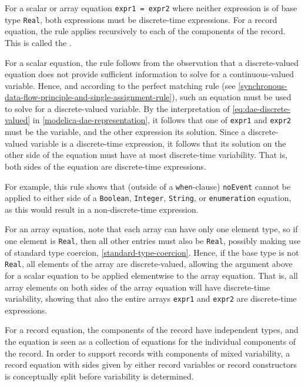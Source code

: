 For a scalar or array equation \lstinline!expr1 = expr2! where neither expression is of base type \lstinline!Real!, both expressions must be discrete-time expressions.
For a record equation, the rule applies recursively to each of the components of the record.
This is called the .

\begin{nonnormative}
For a scalar equation, the rule follows from the observation that a discrete-valued equation does not provide sufficient information to solve for a continuous-valued variable.
Hence, and according to the perfect matching rule (see \cref{synchronous-data-flow-principle-and-single-assignment-rule}), such an equation must be used to solve for a discrete-valued variable.
By the interpretation of \eqref{eq:dae-discrete-valued} in \cref{modelica-dae-representation}, it follows that one of \lstinline!expr1! and \lstinline!expr2! must be the variable, and the other expression its solution.
Since a discrete-valued variable is a discrete-time expression, it follows that its solution on the other side of the equation must have at most discrete-time variability.
That is, both sides of the equation are discrete-time expressions.

For example, this rule shows that (outside of a \lstinline!when!-clause) \lstinline!noEvent! cannot be applied to either side of a \lstinline!Boolean!, \lstinline!Integer!, \lstinline!String!, or \lstinline!enumeration! equation, as this would result in a non-discrete-time expression.

For an array equation, note that each array can have only one element type, so if one element is \lstinline!Real!, then all other entries must also be \lstinline!Real!, possibly making use of standard type coercion, \cref{standard-type-coercion}.
Hence, if the base type is not \lstinline!Real!, all elements of the array are discrete-valued, allowing the argument above for a scalar equation to be applied elementwise to the array equation.
That is, all array elements on both sides of the array equation will have discrete-time variability, showing that also the entire arrays \lstinline!expr1! and \lstinline!expr2! are discrete-time expressions.

For a record equation, the components of the record have independent types, and the equation is seen as a collection of equations for the individual components of the record.
In order to support records with components of mixed variability, a record equation with sides given by either record variables or record constructors is conceptually split before variability is determined.
\end{nonnormative}

